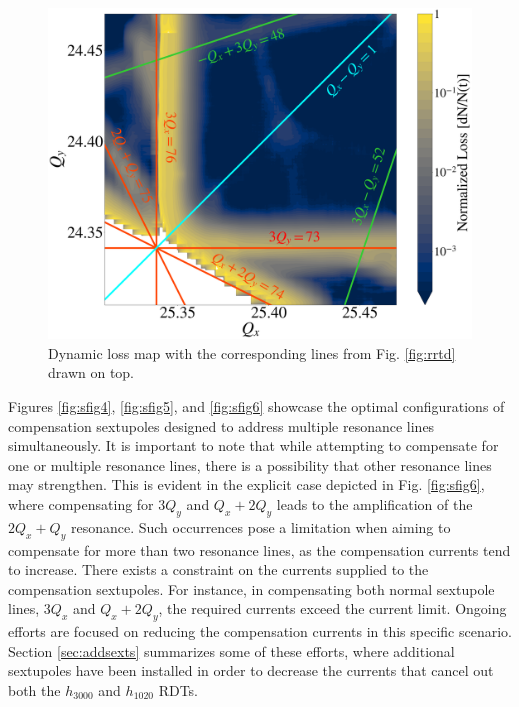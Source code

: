 \begin{figure}[H]
    \centering
    \includegraphics[width=\columnwidth]{chapter4/bare_comments.png}
    \caption{Dynamic loss map with the corresponding lines from Fig. \ref{fig:rrtd} drawn on top.}
    \label{fig:bare_comments}
\end{figure}

Figures \ref{fig:sfig4}, \ref{fig:sfig5}, and \ref{fig:sfig6} showcase the optimal configurations of compensation sextupoles designed to address multiple resonance lines simultaneously. It is important to note that while attempting to compensate for one or multiple resonance lines, there is a possibility that other resonance lines may strengthen. This is evident in the explicit case depicted in Fig. \ref{fig:sfig6}, where compensating for $3Q_y$ and $Q_x+2Q_y$ leads to the amplification of the $2Q_x+Q_y$ resonance. Such occurrences pose a limitation when aiming to compensate for more than two resonance lines, as the compensation currents tend to increase. There exists a constraint on the currents supplied to the compensation sextupoles. For instance, in compensating both normal sextupole lines, $3Q_x$ and $Q_x+2Q_y$, the required currents exceed the current limit. Ongoing efforts are focused on reducing the compensation currents in this specific scenario. Section \ref{sec:addsexts} summarizes some of these efforts, where additional sextupoles have been installed in order to decrease the currents that cancel out both the $h_{3000}$ and $h_{1020}$ RDTs.

